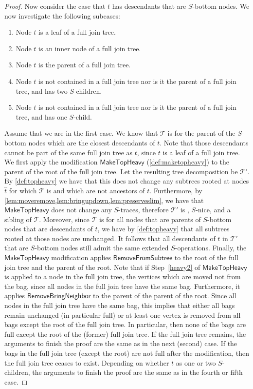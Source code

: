\documentclass[a4paper,UKenglish,cleveref, autoref, thm-restate, numberwithinsect]{lipics-v2021}
\newcounter{modification}
\newcommand{\slim}{\text{slim}\xspace}
\newcommand{\topheavy}{\text{top-heavy}\xspace}
\newcommand{\RemoveBringNeighbor}{\mathsf{RemoveBringNeighbor}}
\newcommand{\RemoveFromSubtree}{\mathsf{RemoveFromSubtree}}
\newcommand{\MakeTopHeavy}{\mathsf{MakeTopHeavy}}
\begin{document}
\begin{proof}
Now consider the case that $t$ has descendants that are $S$-bottom nodes. We now investigate the following subcases:
\begin{enumerate}
    \item Node $t$ is a leaf of a full join tree.
    \item Node $t$ is an inner node of a full join tree.
    \item Node $t$ is the parent of a full join tree.
    \item Node $t$ is not contained in a full join tree nor is it the parent of a full join tree, and has two $S$-children.
    \item Node $t$ is not contained in a full join tree nor is it the parent of a full join tree, and has one $S$-child.
\end{enumerate}
Assume that we are in the first case. 
We know that $\mathcal{T}$ is \topheavy for the parent of the $S$-bottom nodes which are the closest descendants of $t$. Note that those descendants cannot be part of the same full join tree as $t$, since $t$ is a leaf of a full join tree.
We first apply the modification $\MakeTopHeavy$ (\cref{def:maketopheavy}) to the parent of the root of the full join tree. Let the resulting tree decomposition be $\mathcal{T}'$. By \cref{def:topheavy} we have that this does not change any subtrees rooted at nodes $\hat{t}$ for which $\mathcal{T}$ is \topheavy and which are not ancestors of $t$. 
Furthermore, by \cref{lem:moveremove,lem:bringupdown,lem:preserveslim}, we have that $\MakeTopHeavy$ does not change any $S$-traces, therefore $\mathcal{T}'$ is \slim, $S$-nice, and a sibling of $\mathcal{T}$.
Moreover, since $\mathcal{T}$ is \topheavy for all nodes that are parents of $S$-bottom nodes that are descendants of $t$, we have by \cref{def:topheavy} that all subtrees rooted at those nodes are unchanged. It follows that all descendants of $t$ in $\mathcal{T}'$ that are $S$-bottom nodes still admit the same extended $S$-operations. Finally, the $\MakeTopHeavy$ modification applies $\RemoveFromSubtree$ to the root of the full join tree and the parent of the root. Note that if Step~\ref{heavy2} of $\MakeTopHeavy$ is applied to a node in the full join tree, the vertices which are moved not from the bag, since all nodes in the full join tree have the same bag.  Furthermore, it applies $\RemoveBringNeighbor$ to the parent of the parent of the root. Since all nodes in the full join tree have the same bag, this implies that either all bags remain unchanged (in particular full) or at least one vertex is removed from all bags except the root of the full join tree. In particular, then none of the bags are full except the root of the (former) full join tree. If the full join tree remains, the arguments to finish the proof are the same as in the next (second) case. If the bags in the full join tree (except the root) are not full after the modification, then the full join tree ceases to exist. Depending on whether $t$ as one or two $S$-children, the arguments to finish the proof are the same as in the fourth or fifth case.


\end{proof}
\end{document}
